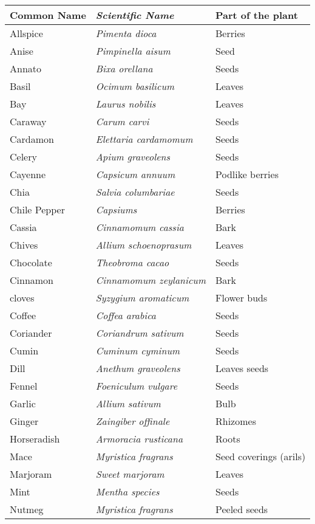 \pagestyle{empty}
{\newpage
\clearpage
\samepage \begin{tabular}{|l| >{\em} l|l|}
\hline
Common Name & Scientific Name & Part of the plant\\ 
\hline\hline
Allspice &  Pimenta dioca & Berries \\ 
Anise & Pimpinella aisum & Seed \\ 
Annato & Bixa orellana &  Seeds \\ 
Basil & Ocimum basilicum &  Leaves \\ 
Bay &  Laurus nobilis & Leaves \\ 
Caraway & Carum carvi & Seeds \\ 
Cardamon & Elettaria cardamomum & Seeds \\ 
Celery & Apium graveolens &  Seeds \\ 
Cayenne & Capsicum annuum &  Podlike berries \\ 
Chia & Salvia columbariae & Seeds \\ 
Chile Pepper & Capsiums & Berries \\ 
Cassia & Cinnamomum cassia & Bark \\ 
Chives & Allium schoenoprasum & Leaves \\ 
Chocolate & Theobroma cacao &  Seeds \\ 
Cinnamon & Cinnamomum zeylanicum & Bark \\ 
cloves & Syzygium aromaticum & Flower buds \\ 
Coffee & Coffea arabica & Seeds \\ 
Coriander & Coriandrum sativum & Seeds \\ 
Cumin &  Cuminum cyminum &  Seeds \\ 
Dill &  Anethum graveolens & Leaves seeds \\ 
Fennel &  Foeniculum vulgare & Seeds \\ 
Garlic & Allium sativum & Bulb \\ 
Ginger & Zaingiber offinale & Rhizomes \\ 
Horseradish & Armoracia rusticana & Roots \\ 
Mace & Myristica fragrans & Seed coverings (arils) \\ 
Marjoram & Sweet marjoram & Leaves \\ 
Mint & Mentha species & Seeds \\ 
Nutmeg & Myristica fragrans & Peeled seeds \\ 

\end{tabular}}
